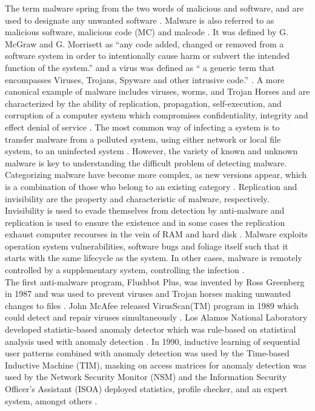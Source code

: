 \documentclass[12pt]{article} %
\begin{document}
The term malware spring from the two words of malicious and software, and are used to designate any unwanted software \cite{Asurveyonmalware}. Malware is also referred to as malicious software, malicious code (MC) and malcode \cite{idika2007survey}. It was defined by G. McGraw and G. Morrisett as “any code added, changed or removed from a software system in order to intentionally cause harm or subvert the intended function of the system.” and a virus was defined as “ a generic term that encompasses Viruses, Trojans, Spyware and other intrusive code.” \cite{idika2007survey,Asurveyonmalware}. A more canonical example of malware includes viruses, worms, and Trojan Horses and are characterized by the ability of replication, propagation, self-execution, and corruption of a computer system which compromises confidentiality, integrity and effect denial of service \cite{Asurveyonmalware}. The most common way of infecting a system is to transfer malware from a polluted system, using either network or local file system, to an uninfected system \cite{Asurveyonmalware}. However, the variety of known and unknown malware is key to understanding the difficult problem of detecting malware. Categorizing malware have become more complex, as new versions appear, which is a combination of those who belong to an existing category \cite{idika2007survey}. Replication and invisibility are the property and characteristic of malware, respectively. Invisibility is used to evade themselves from detection by anti-malware and replication is used to ensure the existence and in some cases the replication exhaust computer recourses in the vein of RAM and hard disk \cite{Asurveyonmalware}. Malware exploits operation system vulnerabilities, software bugs and foliage itself such that it starts with the same lifecycle as the system. In other cases, malware is remotely controlled by a supplementary system, controlling the infection \cite{Asurveyonmalware}. \\
The first anti-malware program, Flushbot Plus, was invented by Ross Greenberg in 1987 and was used to prevent viruses and Trojan horses making unwanted changes to files \cite{Asurveyonmalware}. John McAfee released VirusScan(TM) program in 1989 which could detect and repair viruses simultaneously \cite{Asurveyonmalware}. Los Alamos National Laboratory developed statistic-based anomaly detector which was rule-based on statistical analysis used with anomaly detection \cite{Asurveyonmalware}. In 1990, inductive learning of sequential user patterns combined with anomaly detection was used by the Time-based Inductive Machine (TIM), masking on access matrices for anomaly detection was used by the Network Security Monitor (NSM) and the Information Security Officer’s Assistant (ISOA) deployed statistics, profile checker, and an expert system, amongst others \cite{Asurveyonmalware}. \\
\end{document}
